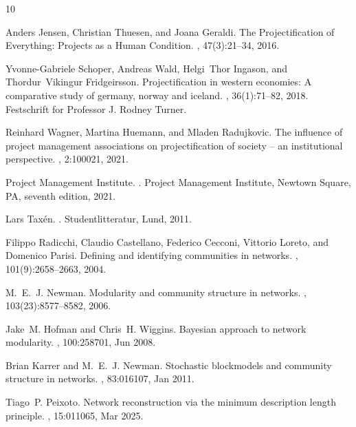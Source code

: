 \documentclass[11pt,a4paper]{article}
\begin{document}
\begin{thebibliography}{10}

Anders Jensen, Christian Thuesen, and Joana Geraldi.
\newblock The {Projectification} of {Everything}: {Projects} as a {Human}
  {Condition}.
, 47(3):21--34, 2016.

Yvonne-Gabriele Schoper, Andreas Wald, Helgi~Thor Ingason, and Thordur~Vikingur
  Fridgeirsson.
\newblock Projectification in western economies: A comparative study of
  germany, norway and iceland.
, 36(1):71--82,
  2018.
\newblock Festschrift for Professor J. Rodney Turner.

Reinhard Wagner, Martina Huemann, and Mladen Radujkovic.
\newblock The influence of project management associations on projectification
  of society – an institutional perspective.
, 2:100021, 2021.

{Project Management Institute}.
.
\newblock Project Management Institute, Newtown Square, PA, seventh edition,
  2021.

Lars Tax{\'e}n.
.
\newblock Studentlitteratur, Lund, 2011.

Filippo Radicchi, Claudio Castellano, Federico Cecconi, Vittorio Loreto, and
  Domenico Parisi.
\newblock Defining and identifying communities in networks.
,
  101(9):2658--2663, 2004.

M.~E.~J. Newman.
\newblock Modularity and community structure in networks.
,
  103(23):8577--8582, 2006.

Jake~M. Hofman and Chris~H. Wiggins.
\newblock Bayesian approach to network modularity.
, 100:258701, Jun 2008.

Brian Karrer and M.~E.~J. Newman.
\newblock Stochastic blockmodels and community structure in networks.
, 83:016107, Jan 2011.

Tiago~P. Peixoto.
\newblock Network reconstruction via the minimum description length principle.
, 15:011065, Mar 2025.


\end{thebibliography}
\end{document}
